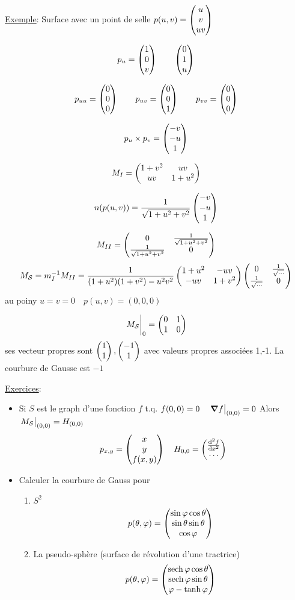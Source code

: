 \underline{Exemple}: Surface avec un point de selle $p(u,v) = \begin{pmatrix} u\\v\\uv \end{pmatrix}$  


$$p_{u} = \begin{pmatrix} 1\\0\\v \end{pmatrix} \qquad \begin{pmatrix} 0\\1\\u \end{pmatrix}$$ 


$$p_{uu} =\begin{pmatrix} 0\\0\\0 \end{pmatrix}\qquad p_{uv} =\begin{pmatrix} 0\\0\\1 \end{pmatrix} \qquad p_{vv} = \begin{pmatrix} 0\\0\\0 \end{pmatrix}$$ 


$$p_{u} \times  p_{v} =\begin{pmatrix} -v\\-u\\1 \end{pmatrix}$$ 

$$M_{I} = \begin{pmatrix} 1+v^2 & uv\\ uv&1+u^2 \end{pmatrix}$$ 

$$n(p(u,v)) = \frac{1}{\sqrt{1+u^2+v^2}} \begin{pmatrix} -v\\-u\\1 \end{pmatrix}$$ 

$$M_{II} = \begin{pmatrix} 0 & \frac{1}{\sqrt{1+u^2+v^2}}\\\frac{1}{\sqrt{1+u^2+v^2}} &0  \end{pmatrix}$$ 
$$M_{\mathcal{S} } = m_{I}^{-1}M_{II} = \frac{1}{(1+u^2)(1+v^2)-u^2v^2}\begin{pmatrix} 1+u^2 &-uv\\-uv &1+v^2 \end{pmatrix}\begin{pmatrix} 0 &\frac{1}{\sqrt{\dotsb}} \\ \frac{1}{\sqrt{\dotsb}} &0  \end{pmatrix} $$ 
au poiny $u=v=0 \quad p(u,v) = (0,0,0)$  

$$\eval{M_{\mathcal{S} }}_0 = \cols{0&1\\1&0}$$
ses vecteur propres sont $\begin{pmatrix} 1\\1 \end{pmatrix}, \begin{pmatrix} -1\\1 \end{pmatrix}$ avec valeurs propres associées 1,-1. La courbure de Gausse est $-1$  


\underline{Exercices}:
\begin{itemize}
\item Si $S$ est le graph d'une fonction $f$ t.q. $f(0,0) = 0 \quad \eval{\grad f}_{(0,0)} =0$ Alors $\eval{M_{\mathcal{S} } }_{(0,0)} = H_{(0,0)} $  $$p_{x,y} = \begin{pmatrix} x\\y\\f(x,y) \end{pmatrix}\quad H_{0,0} = \begin{pmatrix} \dv[2]{f}{x}\\\dotsb \end{pmatrix}$$ 
\item Calculer la courbure de Gauss pour \begin{enumerate}
	\item $S^2$ $$p(\theta, \varphi) = \begin{pmatrix} \sin\varphi\cos\theta\\\sin\theta\sin\theta\\\cos\varphi \end{pmatrix}$$  
	\item La pseudo-sphère (surface  de révolution d'une tractrice) $$p(\theta, \varphi) = \cols{\sech\varphi\cos\theta\\\sech\varphi\sin\theta\\\varphi-\tanh\varphi}$$ 
\end{enumerate}	
\end{itemize}


